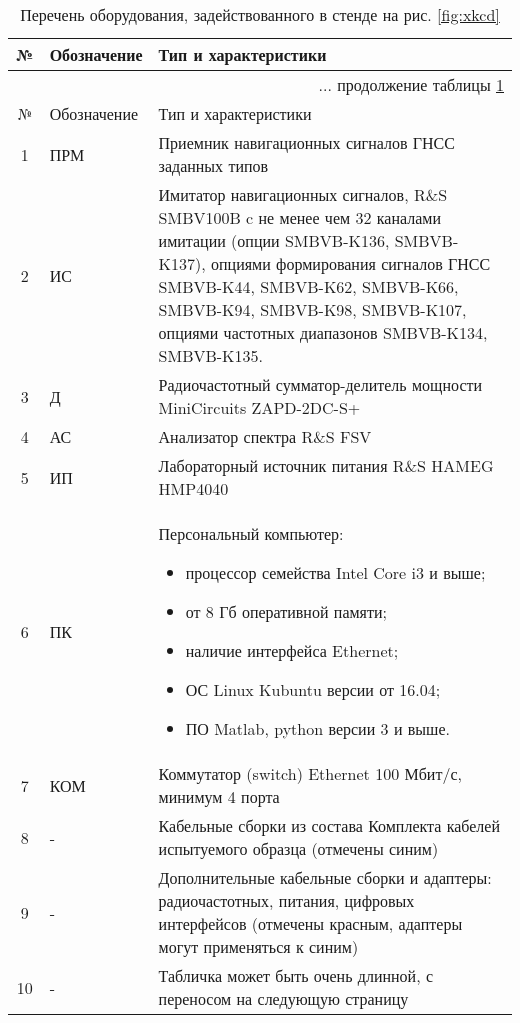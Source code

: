 	\begin{longtable}{|c|p{4cm}|p{11cm}|}
		\caption{Перечень оборудования, задействованного в стенде на рис. \ref{fig:xkcd}} \label{tab:stend_eqip}\\
		\hline 
		№ & Обозначение & Тип и характеристики  \\		
		\endfirsthead
		\multicolumn{3}{r}{... продолжение таблицы \ref{tab:stend_eqip}}\\ [1em] %
		\hline 
		№ & Обозначение & Тип и характеристики  \\
		\endhead
		\hline
		
		1 &  ПРМ                       & Приемник навигационных сигналов ГНСС заданных типов \\ 
		\hline 
		
		2 &  ИС  &  Имитатор навигационных сигналов, R\&S SMBV100B c не менее чем 32 каналами имитации (опции SMBVB-K136, SMBVB-K137), опциями формирования сигналов ГНСС SMBVB-K44, SMBVB-K62, SMBVB-K66, SMBVB-K94, SMBVB-K98, SMBVB-K107, опциями частотных диапазонов SMBVB-K134, SMBVB-K135.
		\\ 
		\hline 
		
		3 & Д                         & Радиочастотный сумматор-делитель мощности MiniCircuits ZAPD-2DC-S+  \\
		\hline
		
		4 & АС                         & Анализатор спектра R\&S FSV \\
		\hline
		
		5 & ИП                         & Лабораторный источник питания R\&S HAMEG HMP4040 \\
		\hline
		
		6 & ПК                         & Персональный компьютер: 
		\begin{itemize}
			\item процессор семейства Intel Core i3 и выше; 
			\item от 8 Гб оперативной памяти;
			\item наличие интерфейса Ethernet;
			\item ОС Linux Kubuntu версии от 16.04;
			\item ПО Matlab, python версии 3 и выше.
		\end{itemize} 
		\\ 
		\hline 
		
		7 & КОМ & Коммутатор (switch) Ethernet 100 Мбит/с, минимум 4 порта \\ 
		\hline 
		
		8 & -          & Кабельные сборки из состава Комплекта кабелей испытуемого образца (отмечены синим)  \\ 
		\hline 
		
		9 & -          & Дополнительные кабельные сборки и адаптеры: радиочастотных, питания, цифровых интерфейсов (отмечены красным, адаптеры могут применяться к синим) \\ 
		\hline 

		10 & -         & Табличка может быть очень длинной, с переносом на следующую страницу \\ 
		\hline 		
		
	\end{longtable}

